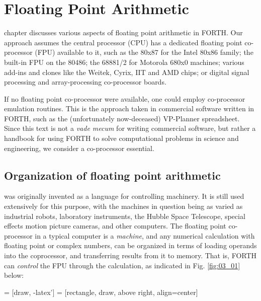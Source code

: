 
\chapter{Floating Point Arithmetic}

\addtocounter{equation}{1} %

\tableofcontents

 chapter discusses various aspects of floating point arithmetic in
FORTH. Our approach assumes the central processor (CPU) has a dedicated floating
point co-processor (FPU) available to it, such as the 80x87 for the Intel 80x86 family; the
built-in FPU on the 80486; the 68881/2 for Motorola 680x0
machines; various add-ins and clones like the Weitek, Cyrix, IIT
and AMD chips; or digital signal processing and array-processing
co-processor boards.

If no floating point co-processor were available, one could
employ co-processor emulation routines. This is the approach
taken in commercial software written in FORTH, such as the
(unfortunately now-deceased) VP-Planner spreadsheet. Since
this text is not a \textit{vade mecum} for writing commercial software, but
rather a handbook for using FORTH to solve computational
problems in science and engineering, we consider a co-processor
essential.

\section{Organization of floating point arithmetic}

 was originally invented as a language for controlling 
machinery. It is still used extensively for this purpose, with the
machines in question being as varied as industrial robots,
laboratory instruments, the Hubble Space Telescope, special
effects motion picture cameras, and other computers. The floating point
co-processor in a typical computer is a \textit{machine}, and any
numerical calculation with floating point or complex numbers, \eg can be organized in terms of loading operands into the
coprocessor, and transferring results from it to memory. That is,
FORTH can \textit{control} the FPU through the calculation, as indicated in Fig.
\ref{fig:03_01} below:

 = [draw, -latex']
 = [rectangle, draw, above right, align=center]

